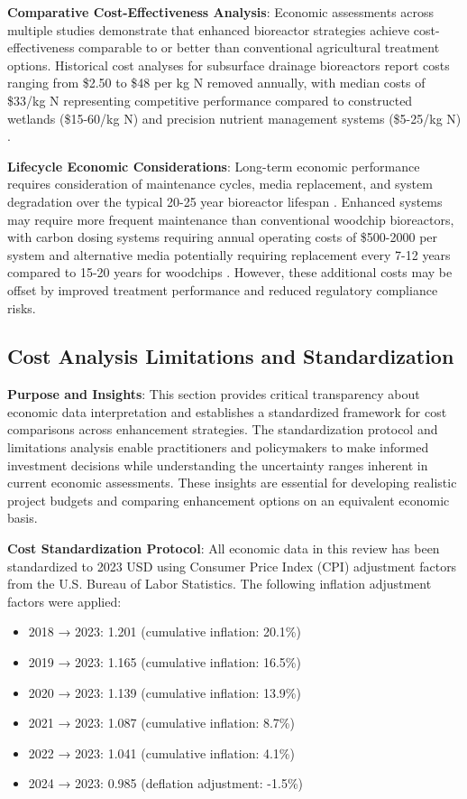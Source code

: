 \documentclass[12pt,a4paper]{article}
\begin{document}
\textbf{Comparative Cost-Effectiveness Analysis}: Economic assessments across multiple studies demonstrate that enhanced bioreactor strategies achieve cost-effectiveness comparable to or better than conventional agricultural treatment options. Historical cost analyses for subsurface drainage bioreactors report costs ranging from \$2.50 to \$48 per kg N removed annually, with median costs of \$33/kg N representing competitive performance compared to constructed wetlands (\$15-60/kg N) and precision nutrient management systems (\$5-25/kg N) \citep{RN310, RN289}. 

\textbf{Lifecycle Economic Considerations}: Long-term economic performance requires consideration of maintenance cycles, media replacement, and system degradation over the typical 20-25 year bioreactor lifespan \citep{RN348}. Enhanced systems may require more frequent maintenance than conventional woodchip bioreactors, with carbon dosing systems requiring annual operating costs of \$500-2000 per system and alternative media potentially requiring replacement every 7-12 years compared to 15-20 years for woodchips \citep{RN605, RN350}. However, these additional costs may be offset by improved treatment performance and reduced regulatory compliance risks.

\subsection{Cost Analysis Limitations and Standardization}

\textbf{Purpose and Insights}: This section provides critical transparency about economic data interpretation and establishes a standardized framework for cost comparisons across enhancement strategies. The standardization protocol and limitations analysis enable practitioners and policymakers to make informed investment decisions while understanding the uncertainty ranges inherent in current economic assessments. These insights are essential for developing realistic project budgets and comparing enhancement options on an equivalent economic basis.

\textbf{Cost Standardization Protocol}: All economic data in this review has been standardized to 2023 USD using Consumer Price Index (CPI) adjustment factors from the U.S. Bureau of Labor Statistics. The following inflation adjustment factors were applied:
\begin{itemize}
\item 2018 → 2023: 1.201 (cumulative inflation: 20.1\%)
\item 2019 → 2023: 1.165 (cumulative inflation: 16.5\%)
\item 2020 → 2023: 1.139 (cumulative inflation: 13.9\%)
\item 2021 → 2023: 1.087 (cumulative inflation: 8.7\%)
\item 2022 → 2023: 1.041 (cumulative inflation: 4.1\%)
\item 2024 → 2023: 0.985 (deflation adjustment: -1.5\%)
\end{itemize}
\end{document}
